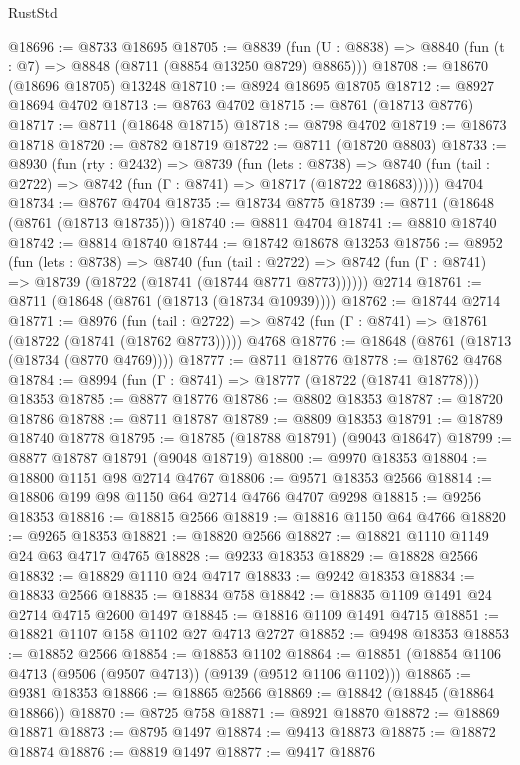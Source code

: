 \begin{lexlean}{RustStd}
\begin{coremodule}
@18696 := @8733 @18695
@18705 := @8839
    (fun (U : @8838) => @8840 (fun (t : @7) => @8848 (@8711 (@8854 @13250 @8729) @8865)))
@18708 := @18670 (@18696 @18705) @13248
@18710 := @8924 @18695 @18705
@18712 := @8927 @18694 @4702
@18713 := @8763 @4702
@18715 := @8761 (@18713 @8776)
@18717 := @8711 (@18648 @18715)
@18718 := @8798 @4702
@18719 := @18673 @18718
@18720 := @8782 @18719
@18722 := @8711 (@18720 @8803)
@18733 := @8930
    (fun (rty : @2432) =>
    @8739
      (fun (lets : @8738) =>
      @8740 (fun (tail : @2722) => @8742 (fun (Γ : @8741) => @18717 (@18722 @18683)))))
    @4704
@18734 := @8767 @4704
@18735 := @18734 @8775
@18739 := @8711 (@18648 (@8761 (@18713 @18735)))
@18740 := @8811 @4704
@18741 := @8810 @18740
@18742 := @8814 @18740
@18744 := @18742 @18678 @13253
@18756 := @8952
    (fun (lets : @8738) =>
    @8740
      (fun (tail : @2722) =>
      @8742 (fun (Γ : @8741) => @18739 (@18722 (@18741 (@18744 @8771 @8773))))))
    @2714
@18761 := @8711 (@18648 (@8761 (@18713 (@18734 @10939))))
@18762 := @18744 @2714
@18771 := @8976
    (fun (tail : @2722) => @8742 (fun (Γ : @8741) => @18761 (@18722 (@18741 (@18762 @8773)))))
    @4768
@18776 := @18648 (@8761 (@18713 (@18734 (@8770 @4769))))
@18777 := @8711 @18776
@18778 := @18762 @4768
@18784 := @8994 (fun (Γ : @8741) => @18777 (@18722 (@18741 @18778))) @18353
@18785 := @8877 @18776
@18786 := @8802 @18353
@18787 := @18720 @18786
@18788 := @8711 @18787
@18789 := @8809 @18353
@18791 := @18789 @18740 @18778
@18795 := @18785 (@18788 @18791) (@9043 @18647)
@18799 := @8877 @18787 @18791 (@9048 @18719)
@18800 := @9970 @18353
@18804 := @18800 @1151 @98 @2714 @4767
@18806 := @9571 @18353 @2566
@18814 := @18806 @199 @98 @1150 @64 @2714 @4766 @4707 @9298
@18815 := @9256 @18353
@18816 := @18815 @2566
@18819 := @18816 @1150 @64 @4766
@18820 := @9265 @18353
@18821 := @18820 @2566
@18827 := @18821 @1110 @1149 @24 @63 @4717 @4765
@18828 := @9233 @18353
@18829 := @18828 @2566
@18832 := @18829 @1110 @24 @4717
@18833 := @9242 @18353
@18834 := @18833 @2566
@18835 := @18834 @758
@18842 := @18835 @1109 @1491 @24 @2714 @4715 @2600 @1497
@18845 := @18816 @1109 @1491 @4715
@18851 := @18821 @1107 @158 @1102 @27 @4713 @2727
@18852 := @9498 @18353
@18853 := @18852 @2566
@18854 := @18853 @1102
@18864 := @18851 (@18854 @1106 @4713 (@9506 (@9507 @4713)) (@9139 (@9512 @1106 @1102)))
@18865 := @9381 @18353
@18866 := @18865 @2566
@18869 := @18842 (@18845 (@18864 @18866))
@18870 := @8725 @758
@18871 := @8921 @18870
@18872 := @18869 @18871
@18873 := @8795 @1497
@18874 := @9413 @18873
@18875 := @18872 @18874
@18876 := @8819 @1497
@18877 := @9417 @18876

\end{coremodule}
\end{lexlean}
